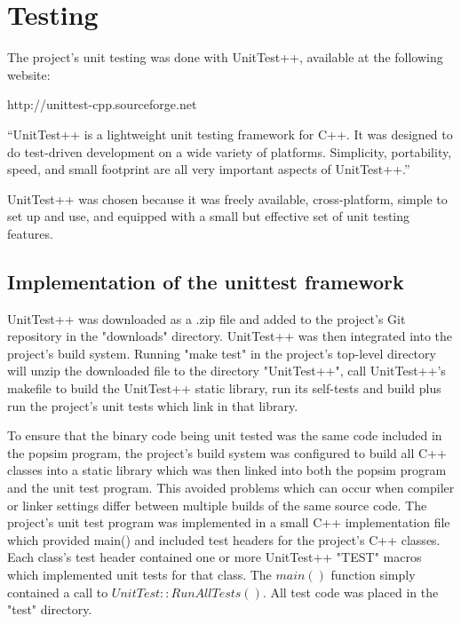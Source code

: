 \section{Testing}
\label{Testing}

The project's unit testing was done with UnitTest++, available at the following website:
\begin{center}
 http://unittest-cpp.sourceforge.net
\end{center}
\begin{center}
``UnitTest++ is a lightweight unit testing framework for C++.  It was designed to do test-driven development on a wide variety of platforms. Simplicity, portability, speed, and small footprint are all very important aspects of UnitTest++.''\cite{ref:unittest}
\end{center}

UnitTest++ was chosen because it was freely available, cross-platform, simple to set up and use, and equipped with a small but effective set of unit testing features.
\subsection{Implementation of the unittest framework}
UnitTest++ was downloaded as a .zip file and added to the project's Git repository in the "downloads" directory.
UnitTest++ was then integrated into the project's build system.
Running "make test" in the project's top-level directory will unzip the downloaded file to the directory "UnitTest++", call UnitTest++'s makefile to build the UnitTest++ static library, run its self-tests and build plus run the project's unit tests which link in that library.

To ensure that the binary code being unit tested was the same code included in the popsim program, the project's build system was configured to build all C++ classes into a static library which was then linked into both the popsim program and the unit test program. This avoided problems which can occur when compiler or linker settings differ between multiple builds of the same source code.
The project's unit test program was implemented in a small C++ implementation file which provided main() and included test headers for the project's C++ classes.  Each class's test header contained one or more UnitTest++ "TEST" macros which implemented unit tests for that class.  The $main()$ function simply contained a call to $UnitTest::RunAllTests()$. All test code was placed in the "test" directory.

